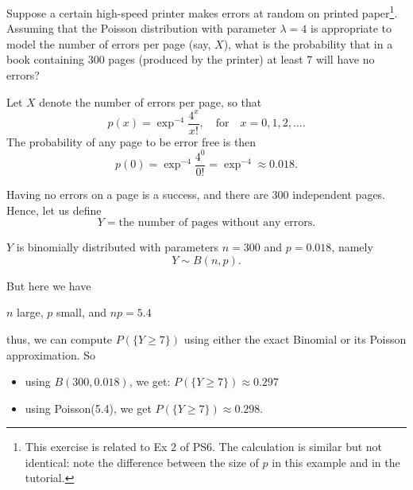 \documentclass[smaller, handout]{beamer}\usepackage[]{graphicx}\usepackage[]{color}
\begin{document}
\begin{frame}{\secname}%

\begin{example}
Suppose a certain high-speed printer makes errors at random on printed paper\footnote{This exercise is related to Ex 2 of PS6. The calculation is similar but not identical: note the difference between the size of $p$ in this example and in the tutorial.}. Assuming that the Poisson
distribution with parameter $\lambda = 4$ is appropriate to model the number of errors per page (say, $X$), what is the probability that in a book containing 300 pages (produced by the printer) at least 7 will have no errors?

\vspace{0.3cm}
Let $X$ denote the number of errors per page, so that
$$
p(x) = \exp^{-4}\frac{4^x}{x!}, \quad \text{for} \quad x = 0,1,2,....
$$
The probability of any page to be error free is then
$$p(0) = \exp^{-4}\frac{4^0}{0!} = \exp^{-4} \approx 0.018.$$

\end{example}
\end{frame}%

\begin{frame}{\secname}%

\begin{example}[cont'd]

Having no errors on a page is a success, and there are 300 independent pages. Hence, let us define
$$
Y = \text{the number of pages without any errors}.
$$

$Y$ is binomially distributed with parameters $n = 300$
and $p = 0.018$, namely
$$Y\sim B(n,p).$$

But here we have
\begin{center}
$n$ large, $p$ small, and $n p = 5.4$
\end{center}
thus, we can compute $P(\{Y \geq 7\})$  using either the exact Binomial or its Poisson approximation. So
\begin{itemize}
\item using $B(300,0.018)$, we get: $P(\{Y \geq 7\}) \approx  0.297$ \\ \vspace{0.1cm}

\item using Poisson(5.4), we get $P(\{Y \geq 7\})  \approx  0.298.$
\end{itemize}



\end{example}
\end{frame}%
\end{document}
